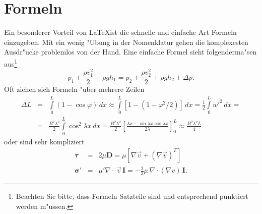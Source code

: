 \chapter{Formeln}\label{cha-formeln}

Ein besonderer Vorteil von \LaTeX ist die schnelle und einfache Art Formeln einzugeben. Mit ein wenig "Ubung in der Nomenklatur gehen die komplexesten Ausdr"ucke problemlos von der Hand. Eine einfache Formel sieht folgenderma"sen aus\footnote{Beachten Sie bitte, dass Formeln Satzteile sind und entsprechend punktiert werden m"ussen.}
\begin{equation}
p_1+\frac{\rho v_1^2}{2}+\rho gh_1=p_2+\frac{\rho v_2^2}{2}+\rho gh_2+\Delta p.
\label{eqn-bernoulli}
\end{equation}
Oft ziehen sich Formeln "uber mehrere Zeilen  
\begin{eqnarray}
\Delta L&=&\int\limits_0^L(1-\cos\varphi)\,dx\approx\int\limits_0^L[1-(1-\varphi^2/2)]\,dx=\frac{1}{2}\int\limits_0^Lw'^2\,dx=\nonumber\\
&=&\frac{B^2\lambda^2}{2}\int\limits_0^L\cos^2\lambda x\,dx=\frac{B^2\lambda^2}{2}\left[\frac{\lambda x-\sin\lambda x\cos\lambda x}{2\lambda}\right]_0^L\approx\frac{B^2\lambda^2L}{4}
\end{eqnarray}
oder sind sehr kompliziert
\begin{eqnarray}
\boldsymbol{\tau}&=&2\mu\mathbf{D}=\mu[\nabla\vec{v}+(\nabla\vec{v})^T]\\
\boldsymbol{\sigma}'&=&\mu'\nabla\cdot\,\vec{v}\,\mathbf{I}=-\frac{2}{3}\mu\,\nabla\cdot(\nabla{v})\,\mathbf{I}.
\end{eqnarray}
